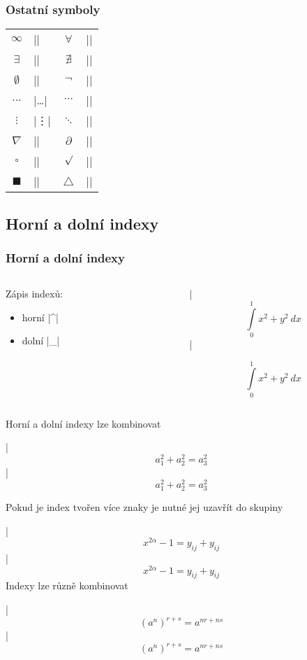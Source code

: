 \begin{frame}[fragile]
	\frametitle{Ostatní symboly}
	\begin{center}
		\begin{tabular}{clcl}
			$\infty$ & |\infty| & $\forall$ & |\forall|\\
			$\exists$ & |\exists| & $\nexists$ & |\nexists|\\
			$\emptyset$ & |\emptyset| & $\neg$ & |\neg|\\
			$\ldots$ & |\ldots| & $\cdots$ & |\cdots|\\
			$\vdots$ & |\vdots| & $\ddots$ & |\ddots|\\
			$\nabla$ & |\nabla| & $\partial$ & |\partial|\\
			$\square$ & |\square| & $\surd$ & |\surd|\\
			$\blacksquare$ & |\blacksquare| & $\triangle$ & |\triangle|\\
		\end{tabular}
	\end{center}
\end{frame}


\subsection{Horní a dolní indexy}
\begin{frame}
	\frametitle{Horní a dolní indexy}
	\begin{columns}
		\begin{column}{0.3\textwidth}
			Zápis indexů:
			\begin{itemize}
				\item horní |^|
				\item dolní |_|
			\end{itemize}
		\end{column}
		\begin{column}{0.65\textwidth}
			\begin{center}
				|$$\int\limits_0^1 x^2 + y^2 \ dx $$|
			\end{center}
			$$\int\limits_0^1 x^2 + y^2 \ dx$$
		\end{column}
	\end{columns}
	Horní a dolní indexy lze kombinovat\par
		|$$a_1^2 + a_2^2 = a_3^2$$|
	$$a_1^2 + a_2^2 = a_3^2$$
	\par\framebreak
	Pokud je index tvořen více znaky je nutné jej uzavřít do skupiny\par
	|$$x^{2\alpha} - 1 = y_{ij} + y_{ij}$$|
	$$x^{2\alpha} - 1 = y_{ij} + y_{ij}$$
	Indexy lze různě kombinovat\par
	|$$(a^n)^{r+s} = a^{nr+ns}$$|
	$$(a^n)^{r+s} = a^{nr+ns}$$
\end{frame}


